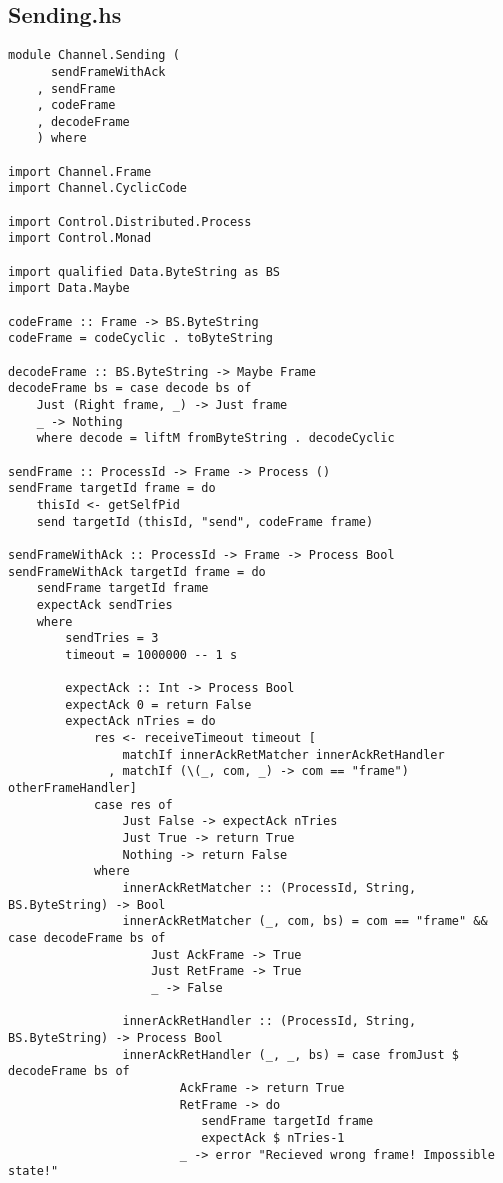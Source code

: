 \documentclass[russian,utf8,simple,emptystyle]{eskdtext}
\begin{document}
\subsection{Sending.hs}
\begin{lstlisting}
module Channel.Sending (
      sendFrameWithAck
    , sendFrame
    , codeFrame
    , decodeFrame
    ) where

import Channel.Frame 
import Channel.CyclicCode

import Control.Distributed.Process 
import Control.Monad

import qualified Data.ByteString as BS 
import Data.Maybe

codeFrame :: Frame -> BS.ByteString 
codeFrame = codeCyclic . toByteString

decodeFrame :: BS.ByteString -> Maybe Frame 
decodeFrame bs = case decode bs of 
    Just (Right frame, _) -> Just frame
    _ -> Nothing    
    where decode = liftM fromByteString . decodeCyclic

sendFrame :: ProcessId -> Frame -> Process ()
sendFrame targetId frame = do
    thisId <- getSelfPid
    send targetId (thisId, "send", codeFrame frame)

sendFrameWithAck :: ProcessId -> Frame -> Process Bool
sendFrameWithAck targetId frame = do 
    sendFrame targetId frame
    expectAck sendTries
    where 
        sendTries = 3    
        timeout = 1000000 -- 1 s

        expectAck :: Int -> Process Bool
        expectAck 0 = return False
        expectAck nTries = do 
            res <- receiveTimeout timeout [
                matchIf innerAckRetMatcher innerAckRetHandler
              , matchIf (\(_, com, _) -> com == "frame") otherFrameHandler]
            case res of 
                Just False -> expectAck nTries
                Just True -> return True
                Nothing -> return False
            where
                innerAckRetMatcher :: (ProcessId, String, BS.ByteString) -> Bool 
                innerAckRetMatcher (_, com, bs) = com == "frame" && case decodeFrame bs of
                    Just AckFrame -> True
                    Just RetFrame -> True
                    _ -> False

                innerAckRetHandler :: (ProcessId, String, BS.ByteString) -> Process Bool
                innerAckRetHandler (_, _, bs) = case fromJust $ decodeFrame bs of
                        AckFrame -> return True
                        RetFrame -> do 
                           sendFrame targetId frame
                           expectAck $ nTries-1 
                        _ -> error "Recieved wrong frame! Impossible state!"


\end{lstlisting}
\end{document}
